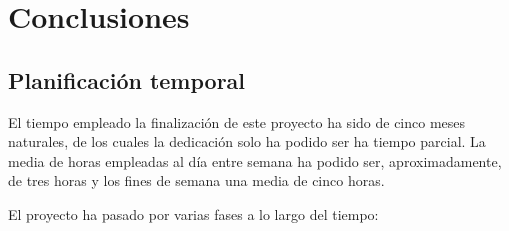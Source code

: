\documentclass[a4paper, 12pt]{book}
\begin{document}

\cleardoublepage
\chapter{Conclusiones}
\label{chap:conclusiones}
 
\section{Planificaci\'on temporal}
\label{sec:planificacion-temporal}

El tiempo empleado la finalizaci\'on de este proyecto ha sido de cinco meses naturales, de los cuales la dedicaci\'on solo ha podido ser ha tiempo parcial. La media de horas empleadas al d\'ia entre semana ha podido ser, aproximadamente, de tres horas y los fines de semana una media de cinco horas. 

El proyecto ha pasado por varias fases a lo largo del tiempo:
\end{document}
